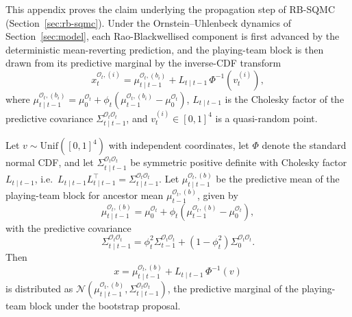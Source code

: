 This appendix proves the claim underlying the propagation step of RB-SQMC (Section~\ref{sec:rb-sqmc}). Under the Ornstein--Uhlenbeck dynamics of Section~\ref{sec:model}, each Rao-Blackwellised component is first advanced by the deterministic mean-reverting prediction, and the playing-team block is then drawn from its predictive marginal by the inverse-CDF transform
\begin{equation}
x_t^{\mathcal{O}_t,(i)} = \mu_{t \mid t-1}^{\mathcal{O}_t,(b_i)} + L_{t \mid t-1}\, \Phi^{-1}\!\left( v_t^{(i)} \right),
\end{equation}
where $\mu_{t \mid t-1}^{\mathcal{O}_t,(b_i)} = \mu_0^{\mathcal{O}_t} + \phi_t(\mu_{t-1}^{\mathcal{O}_t,(b_i)} - \mu_0^{\mathcal{O}_t})$, $L_{t \mid t-1}$ is the Cholesky factor of the predictive covariance $\Sigma_{t \mid t-1}^{\mathcal{O}_t \mathcal{O}_t}$, and $v_t^{(i)} \in [0,1]^4$ is a quasi-random point.

\begin{proposition}
\label{prop:invcdf}
Let $v \sim \mathrm{Unif}([0,1]^4)$ with independent coordinates, let $\Phi$ denote the standard normal CDF, and let $\Sigma_{t \mid t-1}^{\mathcal{O}_t \mathcal{O}_t}$ be symmetric positive definite with Cholesky factor $L_{t \mid t-1}$, i.e.\ $L_{t \mid t-1} L_{t \mid t-1}^{\top} = \Sigma_{t \mid t-1}^{\mathcal{O}_t \mathcal{O}_t}$. Let $\mu_{t \mid t-1}^{\mathcal{O}_t,(b)}$ be the predictive mean of the playing-team block for ancestor mean $\mu_{t-1}^{\mathcal{O}_t,(b)}$, given by
\begin{equation}
\mu_{t \mid t-1}^{\mathcal{O}_t,(b)} = \mu_0^{\mathcal{O}_t} + \phi_t \!\left( \mu_{t-1}^{\mathcal{O}_t,(b)} - \mu_0^{\mathcal{O}_t} \right),
\end{equation}
with the predictive covariance
\begin{equation}
\Sigma_{t \mid t-1}^{\mathcal{O}_t \mathcal{O}_t} = \phi_t^2 \Sigma_{t-1}^{\mathcal{O}_t \mathcal{O}_t} + (1 - \phi_t^2) \Sigma_0^{\mathcal{O}_t \mathcal{O}_t}.
\end{equation}
Then
\begin{equation}
x = \mu_{t \mid t-1}^{\mathcal{O}_t,(b)} + L_{t \mid t-1}\, \Phi^{-1}(v)
\end{equation}
is distributed as $\mathcal{N}\!\left( \mu_{t \mid t-1}^{\mathcal{O}_t,(b)}, \Sigma_{t \mid t-1}^{\mathcal{O}_t \mathcal{O}_t} \right)$, the predictive marginal of the playing-team block under the bootstrap proposal.
\end{proposition}

